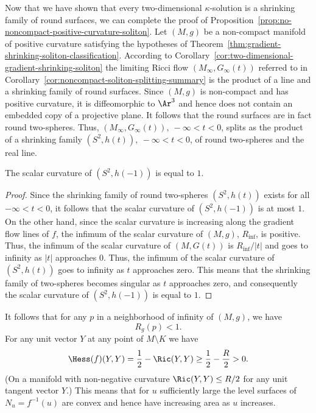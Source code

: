 Now that we have shown that every two-dimensional $\kappa$-solution
is a shrinking family of round surfaces, we can complete the proof
of Proposition~\ref{prop:no-noncompact-positive-curvature-soliton}. Let $(M,g)$ be a non-compact
manifold of positive curvature satisfying the hypotheses of
Theorem~\ref{thm:gradient-shrinking-soliton-classification}. According to Corollary~\ref{cor:two-dimensional-gradient-shrinking-soliton} the
limiting Ricci flow $(M_\infty,G_\infty(t))$ referred to in
Corollary~\ref{cor:noncompact-soliton-splitting-summary} is the product of a line and a
shrinking family of round surfaces. Since $(M,g)$ is non-compact and
has positive curvature, it is diffeomorphic to $\Ar ^3$ and hence
does not contain an embedded copy of a projective plane. It follows
that the round surfaces are in fact  round two-spheres. Thus,
$(M_\infty,G_\infty(t)),\ -\infty<t<0$,  splits as the product of a
shrinking family $(S^2,h(t)),\ -\infty<t<0$, of round two-spheres
and the real line.

\begin{claim}\label{claim:cylinder-limit-scalar-curvature-normalization}
The scalar curvature of $(S^2,h(-1))$ is equal to $1$.
\end{claim}

\begin{proof}
Since the shrinking family of round two-spheres $(S^2,h(t))$ exists for all
$-\infty<t<0$, it follows that the scalar curvature of $(S^2,h(-1))$ is at most
$1$. On the other hand, since the scalar curvature is increasing along the
gradient flow lines of $f$, the infimum of the scalar curvature of $(M,g)$,
$R_\mathrm{inf}$, is positive. Thus, the infimum of the scalar curvature of
$(M,G(t))$ is $R_\mathrm{inf}/|t|$ and goes to infinity as $|t|$ approaches $0$.
Thus, the infimum of the scalar curvature of  $(S^2,h(t))$ goes to infinity as
$t$ approaches zero. This means that the shrinking family of two-spheres
becomes singular as $t$ approaches zero, and consequently the scalar curvature
of $(S^2,h(-1))$ is equal to $1$.
\end{proof}


 It follows that for any $p$ in a
neighborhood of infinity of $(M,g)$, we have
$$R_g(p)< 1.$$
For any unit vector $Y$ at any point of $M\setminus K$ we have
$$\Hess(f)(Y,Y)=\frac{1}{2}-\Ric(Y,Y)\ge \frac{1}{2}-\frac{R}{2}>0.$$
(On a manifold with non-negative curvature $\Ric(Y,Y)\le R/2$ for any unit
tangent vector $Y$.) This means that for $u$ sufficiently large the level
surfaces of $N_u=f^{-1}(u)$ are convex and hence have increasing area as $u$
increases.

